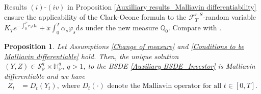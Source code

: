 \documentclass[12,reqno]{amsart}
\numberwithin{equation}{section}
\newtheorem{prop}[defi]{Proposition}
\begin{document}
Results $(i)$-$(iv)$ in Proposition \ref{Auxilliary results_Malliavin differentiability} ensure the applicability of the Clark-Ocone formula to the $\mathcal{F}_{T}^{r,S}$-random variable $K_{T}e^{-\int_{0}^{T}r_{s}\mathrm{d}s}+\widetilde{x}\int_{0}^{T}\alpha_{s}\varphi_{s}\mathrm{d}s$ under the new measure $\mathbb{Q}_{0}$. Compare with \cite[Thm.~4.5, Rmk.~4.6]{nunno2008malliavin}.
\begin{prop}\label{ZSolution to the auxiliary BSDE_2}
	Let Assumptions \ref{Change of measure} and \ref{Conditions to be Malliavin differentiable} hold. Then, the unique solution\\ $(Y,Z)\in{\mathcal{S}_{\mathbb{P}}^{q}}\times\mathbb{H}_{\mathbb{P}}^{q},~{q>1}$, to the BSDE \eqref{Auxiliary BSDE_Investor} is Malliavin differentiable and we have
	\begin{align}\label{ZSolution to the FBSDE1}
		Z_{t}&=D_{t}(Y_{t}),~\text{where $D_{t}(\cdot)$ denote the Malliavin operator for all $t\in[0,T]$.}
	\end{align}
\end{prop}
\end{document}
